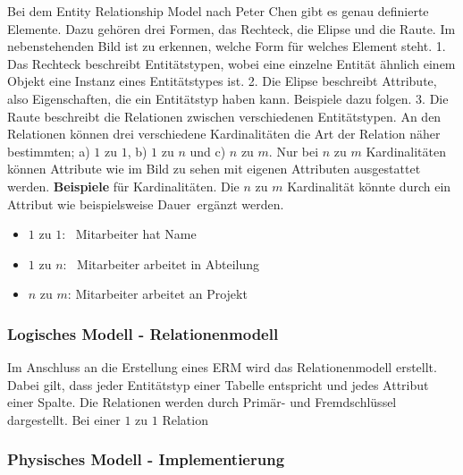 Bei dem Entity Relationship Model nach Peter Chen gibt es genau definierte Elemente. Dazu gehören drei Formen, das Rechteck, die Elipse und die Raute. Im nebenstehenden Bild ist zu erkennen, welche Form für welches Element steht. 1. Das Rechteck beschreibt Entitätstypen, wobei eine einzelne Entität ähnlich einem Objekt eine Instanz eines Entitätstypes ist. 2. Die Elipse beschreibt Attribute, also Eigenschaften, die ein Entitätstyp haben kann. Beispiele dazu folgen. 3. Die Raute beschreibt die Relationen zwischen verschiedenen Entitätstypen. An den Relationen können drei verschiedene Kardinalitäten die Art der Relation näher bestimmten; a) $1$ zu $1$, b) $1$ zu $n$ und c) $n$ zu $m$. Nur bei $n$ zu $m$ Kardinalitäten können Attribute wie im Bild zu sehen mit eigenen Attributen ausgestattet werden. {\bf Beispiele} für Kardinalitäten. Die $n$ zu $m$ Kardinalität könnte durch ein Attribut wie beispielsweise \ql Dauer\qr\ ergänzt werden.
\begin{itemize}
	\itemsep0em
	\item $1$ zu $1$: \ {\sc Mitarbeiter} hat {\sc Name}
	\item $1$ zu $n$: \ {\sc Mitarbeiter} arbeitet in {\sc Abteilung}
	\item $n$ zu $m$: {\sc Mitarbeiter} arbeitet an {\sc Projekt}
\end{itemize}

\subsubsection{Logisches Modell - Relationenmodell}

Im Anschluss an die Erstellung eines ERM wird das Relationenmodell erstellt. Dabei gilt, dass jeder Entitätstyp einer Tabelle entspricht und jedes Attribut einer Spalte. Die Relationen werden durch Primär- und Fremdschlüssel dargestellt. Bei einer $1$ zu $1$ Relation 

\subsubsection{Physisches Modell - Implementierung}



